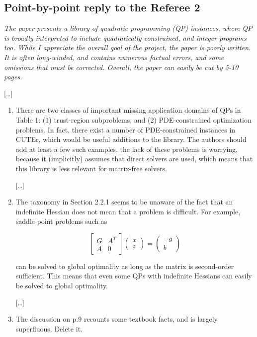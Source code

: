\documentclass[11pt]{article}
\newcommand{\rep}[1]{{\textcolor{acblue}{#1}}}
\begin{document}
\subsection*{Point-by-point reply to the Referee 2}


{\it
The paper presents a library of quadratic programming (QP) instances, where QP is broadly interpreted
to include quadratically constrained, and integer programs too. While I appreciate the overall goal of
the project, the paper is poorly written. It is often long-winded, and contains numerous factual errors,
and some omissions that must be corrected. Overall, the paper can easily be cut by 5-10 pages.
}

\rep{[\dots] }

{\it
\begin{enumerate}

\item There are two classes of important missing application domains of QPs in Table 1: (1) trust-region subproblems, and (2) PDE-constrained optimization problems. In fact, there exist a number of PDE-constrained instances in CUTEr, which would be useful additions to the library. The authors should add at least a few such examples. the lack of these problems is worrying, because
it (implicitly) assumes that direct solvers are used, which means that this library is less relevant for matrix-free solvers.

\rep{[\dots] }


\item The taxonomy in Section 2.2.1 seems to be unaware of the fact that an indefinite Hessian does not mean that a problem is difficult. For example, saddle-point problems such as

$$ \begin{bmatrix}
G & A^T\\
A & 0
\end{bmatrix}
\begin{pmatrix}
x \\
z 
\end{pmatrix}
=
\begin{pmatrix}
-g \\
b 
\end{pmatrix}
$$


can be solved to global optimality as long as the matrix is second-order sufficient. This means
that even some QPs with indefinite Hessians can easily be solved to global optimality.

\rep{[\dots] }


\item The discussion on p.9 recounts some textbook facts, and is largely superfluous. Delete it.


\end{enumerate}}
\end{document}
